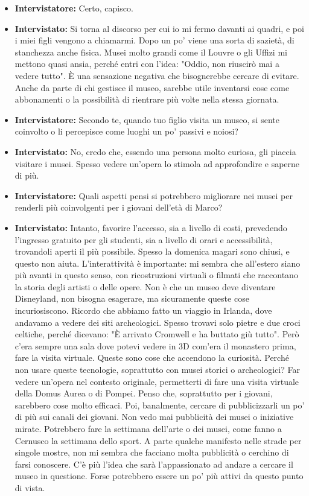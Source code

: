\documentclass{article}
\begin{document}
\begin{itemize}
    \item \textbf{Intervistatore:} Certo, capisco.
    \item \textbf{Intervistato:} Si torna al discorso per cui io mi fermo davanti ai quadri, e poi i miei figli vengono a chiamarmi. Dopo un po' viene una sorta di sazietà, di stanchezza anche fisica. Musei molto grandi come il Louvre o gli Uffizi mi mettono quasi ansia, perché entri con l'idea: "Oddio, non riuscirò mai a vedere tutto". È una sensazione negativa che bisognerebbe cercare di evitare. Anche da parte di chi gestisce il museo, sarebbe utile inventarsi cose come abbonamenti o la possibilità di rientrare più volte nella stessa giornata.
    \item \textbf{Intervistatore:} Secondo te, quando tuo figlio visita un museo, si sente coinvolto o li percepisce come luoghi un po' passivi e noiosi?
    \item \textbf{Intervistato:} No, credo che, essendo una persona molto curiosa, gli piaccia visitare i musei. Spesso vedere un'opera lo stimola ad approfondire e saperne di più.
    \item \textbf{Intervistatore:} Quali aspetti pensi si potrebbero migliorare nei musei per renderli più coinvolgenti per i giovani dell'età di Marco?
    \item \textbf{Intervistato:} Intanto, favorire l'accesso, sia a livello di costi, prevedendo l'ingresso gratuito per gli studenti, sia a livello di orari e accessibilità, trovandoli aperti il più possibile. Spesso la domenica magari sono chiusi, e questo non aiuta. L'interattività è importante: mi sembra che all'estero siano più avanti in questo senso, con ricostruzioni virtuali o filmati che raccontano la storia degli artisti o delle opere. Non è che un museo deve diventare Disneyland, non bisogna esagerare, ma sicuramente queste cose incuriosiscono. Ricordo che abbiamo fatto un viaggio in Irlanda, dove andavamo a vedere dei siti archeologici. Spesso trovavi solo pietre e due croci celtiche, perché dicevano: "È arrivato Cromwell e ha buttato giù tutto". Però c'era sempre una sala dove potevi vedere in 3D com'era il monastero prima, fare la visita virtuale. Queste sono cose che accendono la curiosità. Perché non usare queste tecnologie, soprattutto con musei storici o archeologici? Far vedere un'opera nel contesto originale, permetterti di fare una visita virtuale della Domus Aurea o di Pompei. Penso che, soprattutto per i giovani, sarebbero cose molto efficaci. Poi, banalmente, cercare di pubblicizzarli un po' di più sui canali dei giovani. Non vedo mai pubblicità dei musei o iniziative mirate. Potrebbero fare la settimana dell'arte o dei musei, come fanno a Cernusco la settimana dello sport. A parte qualche manifesto nelle strade per singole mostre, non mi sembra che facciano molta pubblicità o cerchino di farsi conoscere. C'è più l'idea che sarà l'appassionato ad andare a cercare il museo in questione. Forse potrebbero essere un po' più attivi da questo punto di vista.

\end{itemize}
\end{document}
